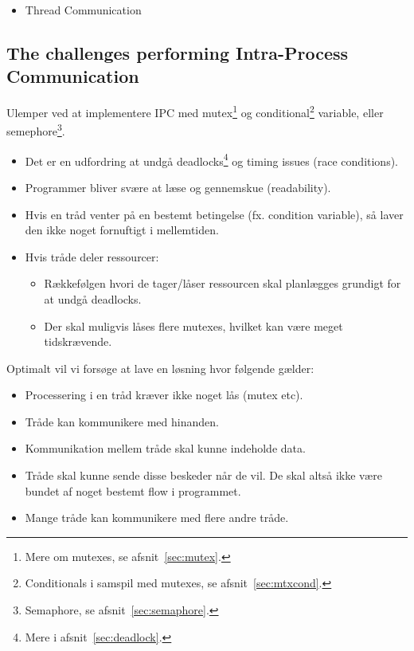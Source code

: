 \begin{itemize}
	\item Thread Communication
\end{itemize}

\newpage

\subsection{The challenges performing Intra-Process Communication}\label{sec:ipc}
Ulemper ved at implementere IPC med mutex\footnote{Mere om mutexes, se afsnit~\ref{sec:mutex}.} og conditional\footnote{Conditionals i samspil med mutexes, se afsnit~\ref{sec:mtxcond}.} variable, eller semephore\footnote{Semaphore, se afsnit~\ref{sec:semaphore}.}.

\begin{itemize}
	\item Det er en udfordring at undgå deadlocks\footnote{Mere i afsnit~\ref{sec:deadlock}.} og timing issues (race conditions).
	\item Programmer bliver svære at læse og gennemskue (readability).
	\item Hvis en tråd venter på en bestemt betingelse (fx. condition variable), så laver den ikke noget fornuftigt i mellemtiden.
	\item Hvis tråde deler ressourcer:
	\begin{itemize}
		\item Rækkefølgen hvori de tager/låser ressourcen skal planlægges grundigt for at undgå deadlocks.
		\item Der skal muligvis låses flere mutexes, hvilket kan være meget tidskrævende.
	\end{itemize}
\end{itemize}

Optimalt vil vi forsøge at lave en løsning hvor følgende gælder:

\begin{itemize}
	\item Processering i en tråd kræver ikke noget lås (mutex etc). 
	\item Tråde kan kommunikere med hinanden.
	\item Kommunikation mellem tråde skal kunne indeholde data.
	\item Tråde skal kunne sende disse beskeder når de vil. De skal altså ikke være bundet af noget bestemt flow i programmet.
	\item Mange tråde kan kommunikere med flere andre tråde.
\end{itemize}


